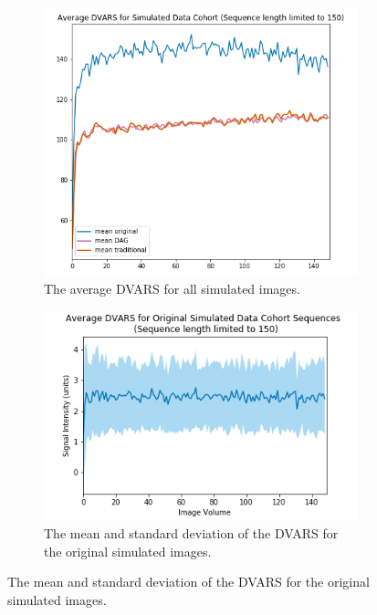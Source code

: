 \begin{figure}[t]
	\begin{subfigure}{0.45\textwidth}
		\centering
		\includegraphics[width=1\textwidth]{6/figures/spectr_dvars_all_150_avg.png}
		\caption{The average DVARS for all simulated images.}
	\end{subfigure}%
	\vspace{0.1\textwidth}
	\begin{subfigure}{0.45\textwidth}
		\centering
		\includegraphics[width=1\textwidth]{6/figures/spectr-bold-dvars-150.png}
		\caption{The mean and standard deviation of the DVARS for the original simulated images.}
	\end{subfigure}
	

\end{figure}

